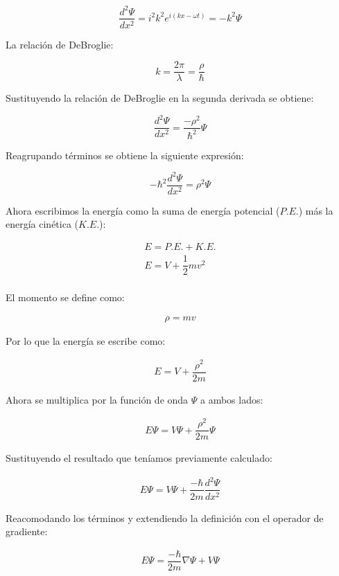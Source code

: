 \[ \dfrac{d^2\Psi}{dx^2} = i^2 k^2 e^{i(kx - \omega t)} = -k^2\Psi \]

La relación de DeBroglie:

\[ k = \dfrac{2\pi}{\lambda} = \dfrac{\rho}{\hbar} \]

Sustituyendo la relación de DeBroglie en la segunda derivada se obtiene:

\[ \dfrac{d^2\Psi}{dx^2} = \dfrac{-\rho^2}{\hbar^2}\Psi \]

Reagrupando términos se obtiene la siguiente expresión:

\[ \boxed{-\hbar^2 \dfrac{d^2\Psi}{dx^2} = \rho^2 \Psi} \]


Ahora escribimos la energía como la suma de energía potencial ($P.E.$) más la energía cinética ($K.E.$):

\begin{eqnarray}
    E = P.E. + K.E. \\
    E = V + \dfrac{1}{2} m v^2 \\
\end{eqnarray}

El momento se define como:

\begin{eqnarray}
    \rho = m v
\end{eqnarray}

Por lo que la energía se escribe como:

\begin{eqnarray}
    E = V + \dfrac{\rho^2}{2m} 
\end{eqnarray}

Ahora se multiplica por la función de onda $\Psi$ a ambos lados:

\begin{eqnarray}
    E\Psi = V\Psi + \dfrac{\rho^2}{2m}\Psi 
\end{eqnarray}

Sustituyendo el resultado que teníamos previamente calculado:

\begin{eqnarray}
    E\Psi = V\Psi + \dfrac{-\hbar}{2m}\dfrac{d^2\Psi}{dx^2} 
\end{eqnarray}

Reacomodando los términos y extendiendo la definición con el operador de gradiente:

\begin{eqnarray}
    \boxed{E\Psi = \dfrac{-\hbar}{2m} \nabla \Psi + V\Psi}
\end{eqnarray}

